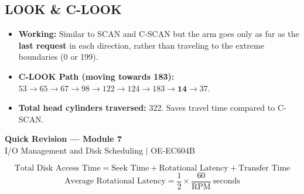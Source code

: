 \documentclass[12pt,a4paper]{article}
\begin{document}
\subsection{LOOK \& C-LOOK}
\begin{itemize}[leftmargin=*, itemsep=3pt]
  \item \textbf{Working:} Similar to SCAN and C-SCAN but the arm goes only as far as the \textbf{last request} in each direction, rather than traveling to the extreme boundaries (0 or 199).
  \item \textbf{C-LOOK Path (moving towards 183):} $53 \to 65 \to 67 \to 98 \to 122 \to 124 \to 183 \to \mathbf{14} \to 37$.
  \item \textbf{Total head cylinders traversed:} 322. Saves travel time compared to C-SCAN.
\end{itemize}

\newpage
\begin{center}
  {\large\bfseries\color{myred} Quick Revision --- Module 7}\\[3pt]
  {\small\color{mydark} I/O Management and Disk Scheduling $|$ OE-EC604B}
\end{center}
\noindent{\color{myred}\rule{\linewidth}{1.2pt}}
\vspace{4pt}

\begin{tcolorbox}[formulabox, title={\textbf{Disk Parameter Definitions}}]
$$\text{Total Disk Access Time} = \text{Seek Time} + \text{Rotational Latency} + \text{Transfer Time}$$
$$\text{Average Rotational Latency} = \frac{1}{2} \times \frac{60}{\text{RPM}}\ \text{seconds}$$
\end{tcolorbox}
\end{document}

